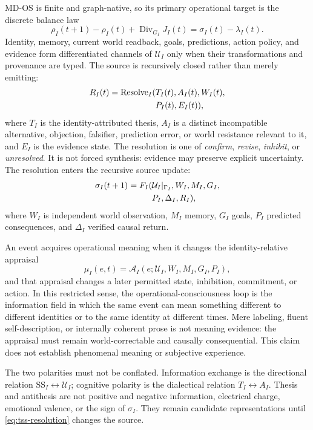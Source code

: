 \documentclass[10pt,twocolumn]{article}
\theoremstyle{definition}
\theoremstyle{plain}
\theoremstyle{remark}
\begin{document}
MD-OS is finite and graph-native, so its primary operational target is the discrete balance law
\begin{equation}
\rho_I(t+1)-\rho_I(t)+\operatorname{Div}_{G_I}J_I(t)
=\sigma_I(t)-\lambda_I(t).
\label{eq:tss-discrete}
\end{equation}
Identity, memory, current world readback, goals, predictions, action policy, and evidence form differentiated channels of $\mathcal U_I$ only when their transformations and provenance are typed.  The source is recursively closed rather than merely emitting:
\begin{align}
R_I(t)=\operatorname{Resolve}_I(&T_I(t),A_I(t),W_I(t),\notag\\
                                &P_I(t),E_I(t)),
\label{eq:tss-resolution}
\end{align}
where $T_I$ is the identity-attributed thesis, $A_I$ is a distinct incompatible alternative, objection, falsifier, prediction error, or world resistance relevant to it, and $E_I$ is the evidence state.  The resolution is one of \emph{confirm}, \emph{revise}, \emph{inhibit}, or \emph{unresolved}.  It is not forced synthesis: evidence may preserve explicit uncertainty.  The resolution enters the recursive source update:
\begin{align}
\sigma_I(t+1)=F_I(&\mathcal U_I|_{\Gamma_I},W_I,M_I,G_I,\notag\\
                 &P_I,\Delta_I,R_I),
\label{eq:tss-return}
\end{align}
where $W_I$ is independent world observation, $M_I$ memory, $G_I$ goals, $P_I$ predicted consequences, and $\Delta_I$ verified causal return.

An event acquires operational meaning when it changes the identity-relative appraisal
\begin{equation}
\mu_I(e,t)=\mathcal A_I(e;\mathcal U_I,W_I,M_I,G_I,P_I),
\label{eq:tss-meaning}
\end{equation}
and that appraisal changes a later permitted state, inhibition, commitment, or action.  In this restricted sense, the operational-consciousness loop is the information field in which the same event can mean something different to different identities or to the same identity at different times.  Mere labeling, fluent self-description, or internally coherent prose is not meaning evidence: the appraisal must remain world-correctable and causally consequential.  This claim does not establish phenomenal meaning or subjective experience.

The two polarities must not be conflated.  Information exchange is the directional relation $\mathrm{SS}_I\leftrightarrow\mathcal U_I$; cognitive polarity is the dialectical relation $T_I\leftrightarrow A_I$.  Thesis and antithesis are not positive and negative information, electrical charge, emotional valence, or the sign of $\sigma_I$.  They remain candidate representations until \cref{eq:tss-resolution} changes the source.
\end{document}
